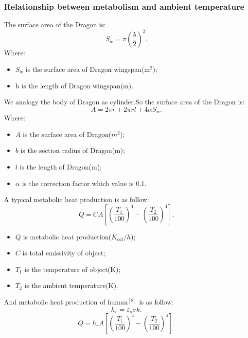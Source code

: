 \documentclass[12pt]{article}
\begin{document}
\subsubsection{Relationship between metabolism and ambient temperature}%
The surface area of the Dragon is:
\begin{equation}
	S_w=\pi \left(\frac{b}{2}\right)^2.	%
\end{equation}	
Where: 
\begin{itemize}
    \item $S_w$ is the surface area of Dragon wingspan(m$^2$);
	 \item b is the length of Dragon wingspan(m).
\end{itemize}
We analogy the body of Dragon as cylinder.So the surface area of the Dragon is:
\begin{equation}
	A=2\pi r + 2\pi rl + 4\alpha S_w.	%
\end{equation}	
Where:
\begin{itemize}
    \item $A$ is the surface area of Dragon($m^2$);
	 \item $b$ is the section radius of Dragon(m);
	 \item $l$ is the length of Dragon(m);
	 \item $\alpha$ is the correction factor which value is 0.1. 
\end{itemize}
A typical metabolic heat production is as follow:
\begin{equation}
	Q = C A \left[\left(\frac{T_1}{100}\right)^4 - \left(\frac{T_2}{100}\right)^4 \right].	%
\end{equation}	
\begin{itemize}
    \item $Q$ is metabolic heat production($K_{cal}/h$);
	 \item $C$ is total emissivity of object;
	 \item $T_1$ is the temperature of object(K);
	 \item $T_2$ is the ambient temperature(K).
\end{itemize}
And metabolic heat production of human$^{[8]}$ is as follow:
\begin{equation}
	h_r=\varepsilon_s \sigma k.	%
\end{equation}	
\begin{equation}
	Q = h_r A \left[\left(\frac{T_1}{100}\right)^4 - \left(\frac{T_2}{100}\right)^4 \right].	%
\end{equation}	
\end{document}
